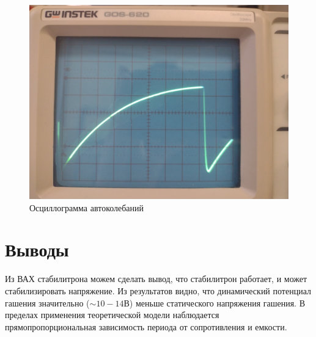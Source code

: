\documentclass{article}
\begin{document}
\newpage
\begin{figure}[h]
    \center\includegraphics[width = 0.6\linewidth]{oscillogram/merged.jpg}
    \caption{Осциллограмма автоколебаний}
\end{figure}

\section{Выводы}
Из ВАХ стабилитрона можем сделать вывод, что стабилитрон работает, и может
стабилизировать напряжение. Из результатов видно, что динамический потенциал гашения
значительно ($\sim10-14 В$) меньше статического напряжения гашения. В пределах применения
теоретической модели наблюдается прямопропорциональная зависимость периода от
сопротивления и емкости.
\end{document}
